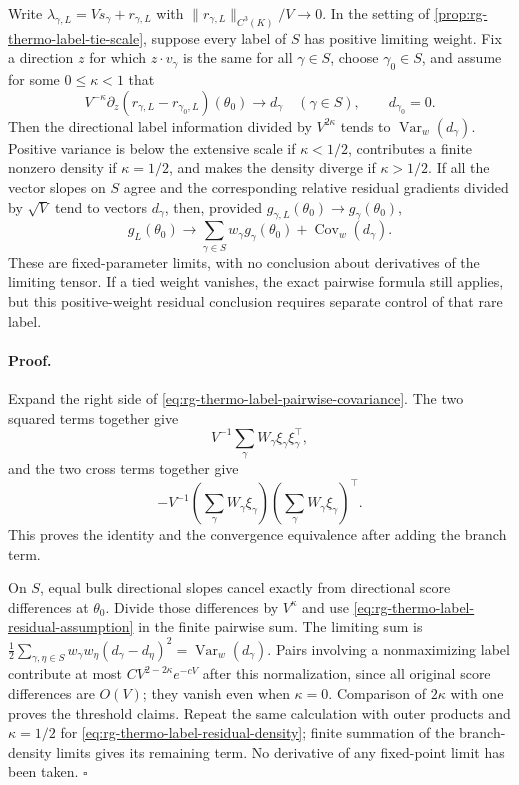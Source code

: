 Write $\lambda_{\gamma,L}=Vs_\gamma+r_{\gamma,L}$ with
$\|r_{\gamma,L}\|_{C^3(K)}/V\to0$. In the setting of
\cref{prop:rg-thermo-label-tie-scale}, suppose every label of $S$ has
positive limiting weight. Fix a direction $z$ for which $z\cdot v_\gamma$
is the same for all $\gamma\in S$, choose $\gamma_0\in S$, and assume
for some $0\leq\kappa<1$ that
\begin{equation}
 V^{-\kappa}\partial_z(r_{\gamma,L}-r_{\gamma_0,L})(\theta_0)
 \longrightarrow d_\gamma\quad(\gamma\in S),
 \qquad d_{\gamma_0}=0.
 \label{eq:rg-thermo-label-residual-assumption}
\end{equation}
Then the directional label information divided by $V^{2\kappa}$ tends
to $\operatorname{Var}_w(d_\gamma)$. Positive variance is below the
extensive scale if $\kappa<1/2$, contributes a finite nonzero density
if $\kappa=1/2$, and makes the density diverge if $\kappa>1/2$.
If all the vector slopes on $S$ agree and the corresponding relative
residual gradients divided by $\sqrt V$ tend to vectors $d_\gamma$,
then, provided $g_{\gamma,L}(\theta_0)\to g_\gamma(\theta_0)$,
\begin{equation}
 g_L(\theta_0)\longrightarrow
       \sum_{\gamma\in S}w_\gamma g_\gamma(\theta_0)
                           +\operatorname{Cov}_w(d_\gamma).
 \label{eq:rg-thermo-label-residual-density}
\end{equation}
These are fixed-parameter limits, with no conclusion about derivatives
of the limiting tensor. If a tied weight vanishes, the exact pairwise
formula still applies, but this positive-weight residual conclusion
requires separate control of that rare label.\thermoestablishedstatus


\paragraph{Proof.}
Expand the right side of \cref{eq:rg-thermo-label-pairwise-covariance}.
The two squared terms together give
\[
 V^{-1}\sum_\gamma W_\gamma\xi_\gamma\xi_\gamma^\top,
\]
and the two cross terms together give
\[
 -V^{-1}\left(\sum_\gamma W_\gamma\xi_\gamma\right)
        \left(\sum_\gamma W_\gamma\xi_\gamma\right)^\top.
\]
This proves the identity and the convergence equivalence after adding
the branch term.

On $S$, equal bulk directional slopes cancel exactly from directional
score differences at $\theta_0$. Divide those differences by
$V^\kappa$ and use \cref{eq:rg-thermo-label-residual-assumption} in the
finite pairwise sum. The limiting sum is
$\frac12\sum_{\gamma,\eta\in S}w_\gamma w_\eta(d_\gamma-d_\eta)^2
=\operatorname{Var}_w(d_\gamma)$. Pairs involving a nonmaximizing label
contribute at most $CV^{2-2\kappa}e^{-cV}$ after this normalization,
since all original score differences are $O(V)$; they vanish even when
$\kappa=0$. Comparison of $2\kappa$ with one proves the threshold
claims. Repeat the same calculation with outer products and
$\kappa=1/2$ for \cref{eq:rg-thermo-label-residual-density}; finite
summation of the branch-density limits gives its remaining term.
No derivative of any fixed-point limit has been taken. $\square$


